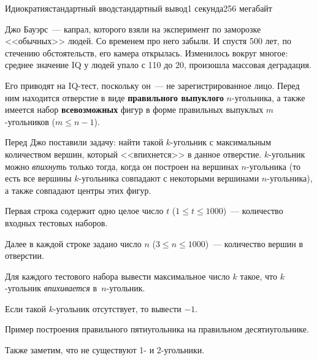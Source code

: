 \begin{problem}[(Макаров Д.\,И.)]{Идиократия}{стандартный ввод}{стандартный вывод}{1 секунда}{256 мегабайт}

Джо Бауэрс~--- капрал, которого взяли на эксперимент по заморозке \linebreak <<обычных>> людей. Со временем про него забыли. И спустя 500 лет, по стечению обстоятельств, его камера открылась. Изменилось вокруг многое: среднее значение IQ у людей упало с 110 до 20, произошла массовая деградация.

Его приводят на IQ-тест, поскольку он~--- не зарегистрированное лицо. Перед ним находится отверстие в виде \textbf{правильного выпуклого} $n$-угольника, а также имеется набор \textbf{всевозможных} фигур в форме правильных выпуклых $m$-угольников ($m \le n - 1$). 

Перед Джо поставили задачу: найти такой $k$-угольник с максимальным количеством вершин, который <<впихнется>> в данное отверстие. $k$-угольник можно \textit{впихнуть} только тогда, когда он построен на вершинах $n$-угольника (то есть все вершины $k$-угольника совпадают с некоторыми вершинами $n$-угольника), а также совпадают центры этих фигур.

\InputFile
Первая строка содержит одно целое число $t$ ($1 \le t \le 1000$)~--- количество входных тестовых наборов.

Далее в каждой строке задано число $n$ ($3 \le n \le 1000$)~--- количество вершин в отверстии.

\OutputFile
Для каждого тестового набора вывести максимальное число $k$ такое, что $k$-уголь\-ник \textit{впихивается} в~$n$-угольник.

Если такой $k$-угольник отсутствует, то вывести $-1$.



\Example

\begin{example}
%
\end{example}

\Note
\centerline{}

Пример построения правильного пятиугольника на правильном десятиугольнике.

Также заметим, что не существуют 1- и 2-угольники.

\end{problem}

